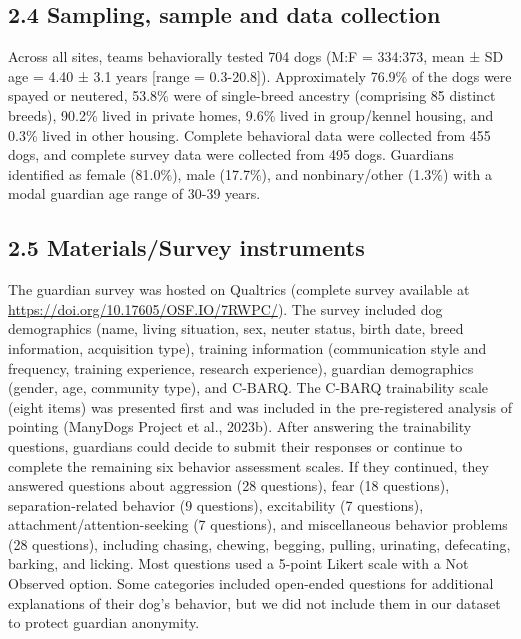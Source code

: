 \documentclass[
  pub,floatsintext]{apa6}
\begin{document}
\hypertarget{sampling-sample-and-data-collection}{%
\subsection{2.4 Sampling, sample and data collection}\label{sampling-sample-and-data-collection}}

Across all sites, teams behaviorally tested 704 dogs (M:F = 334:373, mean ± SD age = 4.40 ± 3.1 years {[}range = 0.3-20.8{]}). Approximately 76.9\% of the dogs were spayed or neutered, 53.8\% were of single-breed ancestry (comprising 85 distinct breeds), 90.2\% lived in private homes, 9.6\% lived in group/kennel housing, and 0.3\% lived in other housing. Complete behavioral data were collected from 455 dogs, and complete survey data were collected from 495 dogs. Guardians identified as female (81.0\%), male (17.7\%), and nonbinary/other (1.3\%) with a modal guardian age range of 30-39 years.

\hypertarget{materialssurvey-instruments}{%
\subsection{2.5 Materials/Survey instruments}\label{materialssurvey-instruments}}

The guardian survey was hosted on Qualtrics (complete survey available at \url{https://doi.org/10.17605/OSF.IO/7RWPC/}). The survey included dog demographics (name, living situation, sex, neuter status, birth date, breed information, acquisition type), training information (communication style and frequency, training experience, research experience), guardian demographics (gender, age, community type), and C-BARQ. The C-BARQ trainability scale (eight items) was presented first and was included in the pre-registered analysis of pointing (ManyDogs Project et al., 2023b). After answering the trainability questions, guardians could decide to submit their responses or continue to complete the remaining six behavior assessment scales. If they continued, they answered questions about aggression (28 questions), fear (18 questions), separation-related behavior (9 questions), excitability (7 questions), attachment/attention-seeking (7 questions), and miscellaneous behavior problems (28 questions), including chasing, chewing, begging, pulling, urinating, defecating, barking, and licking. Most questions used a 5-point Likert scale with a Not Observed option. Some categories included open-ended questions for additional explanations of their dog's behavior, but we did not include them in our dataset to protect guardian anonymity.
\end{document}
